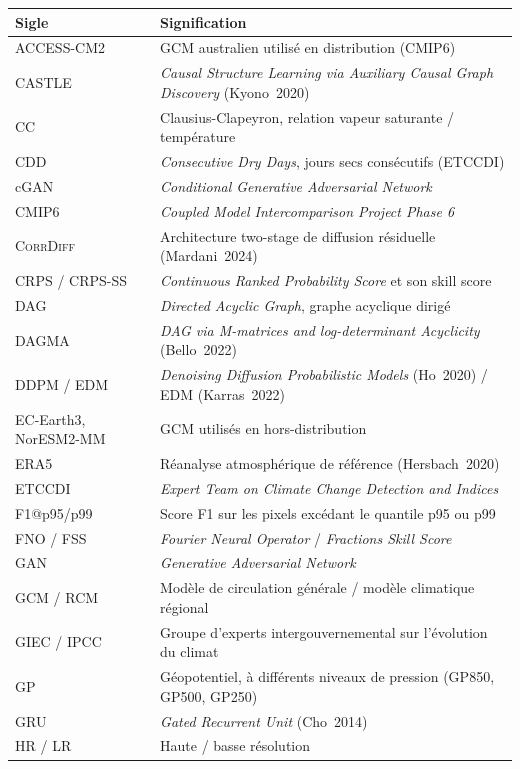 \documentclass[14pt,a4paper,openany]{extreport}
\newcommand{\CorrDiff}{\textsc{CorrDiff}}
\begin{document}
\begin{longtable}{p{3cm} p{11.5cm}}
\toprule
\textbf{Sigle} & \textbf{Signification} \\
\midrule
\endhead

ACCESS-CM2 & GCM australien utilisé en distribution (CMIP6) \\
CASTLE & \emph{Causal Structure Learning via Auxiliary Causal Graph Discovery} (Kyono~2020) \\
CC & Clausius-Clapeyron, relation vapeur saturante / température \\
CDD & \emph{Consecutive Dry Days}, jours secs consécutifs (ETCCDI) \\
cGAN & \emph{Conditional Generative Adversarial Network} \\
CMIP6 & \emph{Coupled Model Intercomparison Project Phase 6} \\
\CorrDiff{} & Architecture two-stage de diffusion résiduelle (Mardani~2024) \\
CRPS / CRPS-SS & \emph{Continuous Ranked Probability Score} et son skill score \\
DAG & \emph{Directed Acyclic Graph}, graphe acyclique dirigé \\
DAGMA & \emph{DAG via M-matrices and log-determinant Acyclicity} (Bello~2022) \\
DDPM / EDM & \emph{Denoising Diffusion Probabilistic Models} (Ho~2020) / EDM (Karras~2022) \\
EC-Earth3, NorESM2-MM & GCM utilisés en hors-distribution \\
ERA5 & Réanalyse atmosphérique de référence (Hersbach~2020) \\
ETCCDI & \emph{Expert Team on Climate Change Detection and Indices} \\
F1@p95/p99 & Score F1 sur les pixels excédant le quantile p95 ou p99 \\
FNO / FSS & \emph{Fourier Neural Operator} / \emph{Fractions Skill Score} \\
GAN & \emph{Generative Adversarial Network} \\
GCM / RCM & Modèle de circulation générale / modèle climatique régional \\
GIEC / IPCC & Groupe d'experts intergouvernemental sur l'évolution du climat \\
GP & Géopotentiel, à différents niveaux de pression (GP850, GP500, GP250) \\
GRU & \emph{Gated Recurrent Unit} (Cho~2014) \\
HR / LR & Haute / basse résolution \\

\end{longtable}
\end{document}
